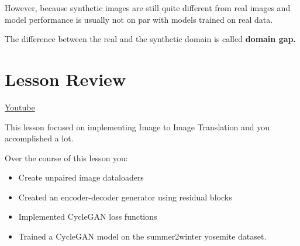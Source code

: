 However, because synthetic images are still quite different from real images and model performance is usually not on par with models trained on real data. \newline

The difference between the real and the synthetic domain is called \textbf{domain gap.}

\section{Lesson Review}
\href{https://www.youtube.com/watch?v=DqqdTYYVA0w}{Youtube} \newline

This lesson focused on implementing Image to Image Translation and you accomplished a lot.

Over the course of this lesson you:

\begin{itemize}
    \item Create unpaired image dataloaders
    \item Created an encoder-decoder generator using residual blocks
    \item Implemented CycleGAN loss functions
    \item Trained a CycleGAN model on the summer2winter yosemite dataset.
\end{itemize}
